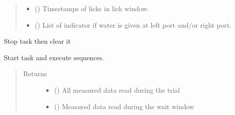 \documentclass[letterpaper,10pt,english]{sphinxmanual}
\begin{document}
\begin{fulllineitems}
\begin{fulllineitems}
\begin{quote}
\begin{description}
\begin{itemize}
\item {} 
\sphinxAtStartPar
{} () \textendash{} Timestamps of licks in lick window.

\item {} 
\sphinxAtStartPar
{} () \textendash{} List of indicator if water is given at left port and/or right port.

\end{itemize}


\end{description}\end{quote}

\end{fulllineitems}


\begin{fulllineitems}
\label{\detokenize{NoSeMazeControl/daqface:daqface.DAQ.DoAiMultiTaskOdourTraining.ClearTasks}}
\pysigstartsignatures
{}
\pysigstopsignatures
\sphinxAtStartPar
Stop task then clear it

\end{fulllineitems}


\begin{fulllineitems}
\label{\detokenize{NoSeMazeControl/daqface:daqface.DAQ.DoAiMultiTaskOdourTraining.DoTask}}
\pysigstartsignatures
{}
\pysigstopsignatures
\sphinxAtStartPar
Start task and execute sequences.
\begin{quote}\begin{description}
\item[{Returns}] \leavevmode
\sphinxAtStartPar
\begin{itemize}
\item {} 
\sphinxAtStartPar
{} () \textendash{} All measured data read during the trial

\item {} 
\sphinxAtStartPar
{} () \textendash{} Measured data read during the wait window


\end{itemize}
\end{description}
\end{quote}
\end{fulllineitems}
\end{fulllineitems}
\end{document}
